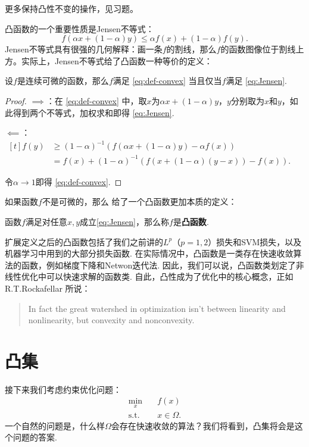 更多保持凸性不变的操作，见习题。

凸函数的一个重要性质是Jensen不等式：
\begin{equation}
    f(\alpha x+(1-\alpha) y)\leq \alpha f(x)+(1-\alpha) f(y). \label{eq:Jensen}
\end{equation}
Jensen不等式具有很强的几何解释：画一条$f$的割线，那么$f$的函数图像位于割线上方。实际上，Jensen不等式给了凸函数一种等价的定义：

\begin{theorem}\label{thm:convex-equivalence}
    设$f$是连续可微的函数，那么$f$满足 \eqref{eq:def-convex} 当且仅当$f$满足 \eqref{eq:Jensen}.
\end{theorem}
\begin{proof}
    $\implies$：在 \eqref{eq:def-convex} 中，取$x$为$\alpha x+(1-\alpha) y$，$y$分别取为$x$和$y$，如此得到两个不等式，加权求和即得 \eqref{eq:Jensen}.

    $\impliedby$：$\begin{aligned}[t]
    f(y)&\geq(1-\alpha)^{-1}(f(\alpha x+(1-\alpha) y)-\alpha f(x))\\
    &=f(x)+(1-\alpha)^{-1}(f(x+(1-\alpha) (y-x))-f(x)).\end{aligned}$
    
    令$\alpha\to 1$即得 \eqref{eq:def-convex}.
\end{proof}

如果函数$f$不是可微的，那么 给了一个凸函数更加本质的定义：
\begin{definition}[凸函数]
    函数$f$满足对任意$x,y$成立\eqref{eq:Jensen}，那么称$f$是\textbf{凸函数}.
\end{definition}

扩展定义之后的凸函数包括了我们之前讲的$L^p$（$p=1,2$）损失和SVM损失，以及机器学习中用到的大部分损失函数. 在实际情况中，凸函数是一类存在快速收敛算法的函数，例如梯度下降和Netwon迭代法. 因此，我们可以说，凸函数类划定了非线性优化中可以快速求解的函数类. 自此，凸性成为了优化中的核心概念，正如R.T.Rockafellar \cite{???} 所说：

\begin{quotation}
\centering
In fact the great watershed in optimization isn't between linearity and nonlinearity, but convexity and nonconvexity.
\end{quotation}

\section{凸集}
接下来我们考虑约束优化问题：
\begin{align*}
    \min_x &\quad f(x)\\
    \text{s.t.}&\quad x\in \Omega.
\end{align*}
一个自然的问题是，什么样$\Omega$会存在快速收敛的算法？我们将看到，凸集将会是这个问题的答案.


